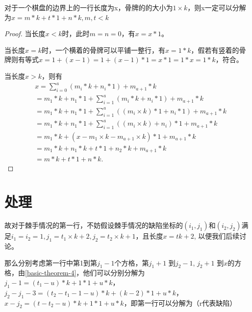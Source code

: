 \begin{theorem}
    对于一个棋盘的边界上的一行长度为x，骨牌的的大小为$1 \times k$，则x一定可以分解为$x = m * k + t * 1 + n * k, m, t < k$

    \label{basic-theorem-4}
\end{theorem}
\begin{proof}
    当长度$x < k$时，此时$m = n = 0$，有$x = x * 1$。

    当长度$x = k$时，一个横着的骨牌可以平铺一整行，有$x = 1 * k$，假若有竖着的骨牌则有等式$x = 1 + (x - 1) = 1 + (x - 1) * 1 = x * 1 = 1 * x = 1 * k$，符合。

    当长度$x > k$，则有
    $$
        \begin{aligned}
             & x = \sum_{i=0}^{a} (m_i * k + n_i * 1)     + m_{a+1} * k                          \\
             & = m_1 * k + n_1 * 1 + \sum_{i=1}^{a} (m_i * k + n_i * 1)+ m_{a+1} * k             \\
             & = m_1 * k + n_1 * 1 + \sum_{i=1}^{a} ((m_i \times k) * 1 + n_i * 1) + m_{a+1} * k \\
             & = m_1 * k + n_1 * 1 + \sum_{i=1}^{a} ((m_i \times k) + n_i) * 1 + m_{a+1} * k     \\
             & = m_1 * k + (x - m_1 \times k - m_{a+1} \times k) * 1 + m_{a+1} * k               \\
             & = m_1 * k + n_1 * k + t * 1 + n_2 * k + m_{a+1} * k                               \\
             & = m * k + t * 1 + n * k.
        \end{aligned}
    $$
\end{proof}

\section*{处理}
故对于棘手情况的第一行，不妨假设棘手情况的缺陷坐标的$(i_1, j_1)$和$(i_2, j_2)$满足$i_1 = i_2 = 1, j_1 = t_1 \times k + 2, j_2 = t_2 \times k + 1$，且长度$x = tk + 2$, 以便我们后续讨论。

那么分别考虑第一行中第1到第$j_1 - 1$个方格，第$j_1 + 1$ 到$j_2 - 1$, $j_2 + 1$ 到$x$的方格，由\ref*{basic-theorem-4}，他们可以分别分解为$j_1 - 1 = (t_1 - u) * k  + 1 * 1 + u * k$，$j_2 - j_1 - 3 = (t_2 - t_1 - 1 - u) * k  + (k - 2) * 1 + u * k$，$x - j_2 = (t - t_2 - u) * k  + 1 * 1 + u * k$，即第一行可以分解为（r代表缺陷）

